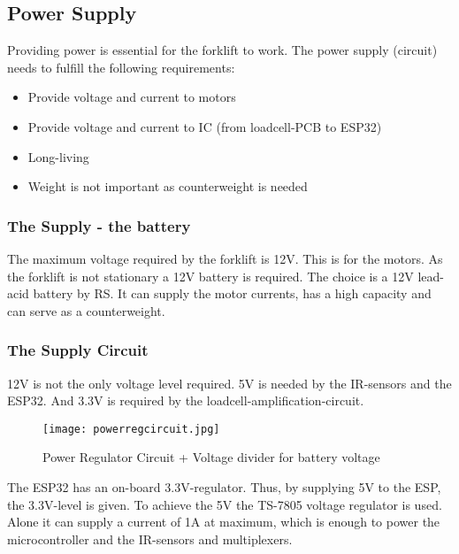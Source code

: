 \documentclass[../report.tex]{subfiles}
\begin{document}
\subsection{Power Supply}
Providing power is essential for the forklift to work. The power supply (circuit)
needs to fulfill the following requirements:
\begin{itemize}
    \item Provide voltage and current to motors
    \item Provide voltage and current to IC (from loadcell-PCB to ESP32)
    \item Long-living
    \item Weight is not important as counterweight is needed
\end{itemize} 
\subsubsection{The Supply - the battery}
The maximum voltage required by the forklift is 12V. This is for the motors. As the forklift
is not stationary a 12V battery is required. The choice is a 12V lead-acid 
battery by RS. It can supply the motor currents, has a high capacity and can serve as a counterweight.
\subsubsection{The Supply Circuit}
12V is not the only voltage level required. 5V is needed by the IR-sensors and the ESP32. And 3.3V is required
by the loadcell-amplification-circuit.
\begin{figure}[h!]
    \centering
    \texttt{[image: powerregcircuit.jpg]}
    \caption{Power Regulator Circuit + Voltage divider for battery voltage}
 \end{figure}
The ESP32 has an on-board 3.3V-regulator. Thus, by supplying 5V to the ESP, the 3.3V-level is given.
To achieve the 5V the TS-7805 voltage regulator is used. Alone it can supply a current of 1A at maximum, which
is enough to power the microcontroller and the IR-sensors and multiplexers.
\end{document}
